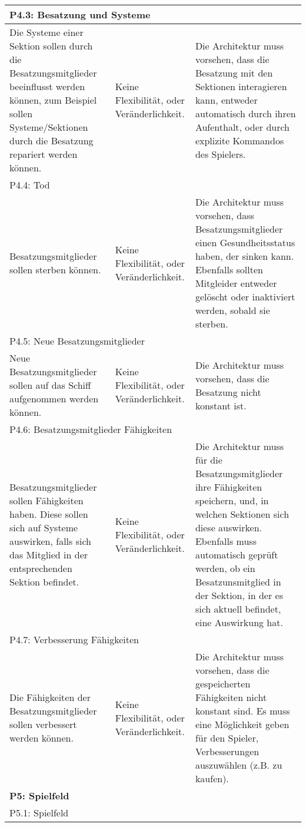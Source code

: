 \documentclass[fontsize=12pt,paper=a4,twoside]{scrartcl}
\begin{document}
\begin{longtable}[c]{|p{5cm}|p{5cm}|p{5cm}|}
\multicolumn{3}{|l|}{{P4.3: Besatzung und Systeme}} 
\\ \hline
Die Systeme einer Sektion sollen durch die Besatzungsmitglieder beeinflusst werden können, zum Beispiel sollen Systeme/Sektionen durch die Besatzung repariert werden können. & Keine Flexibilität, oder Veränderlichkeit.    &  Die Architektur muss vorsehen, dass die Besatzung mit den Sektionen interagieren kann, entweder automatisch durch ihren Aufenthalt, oder durch explizite Kommandos des Spielers. 
\\ \hline
\multicolumn{3}{|l|}{{P4.4: Tod}} 
\\ \hline
Besatzungsmitglieder sollen sterben können. & Keine Flexibilität, oder Veränderlichkeit.    & Die Architektur muss vorsehen, dass Besatzungsmitglieder einen Gesundheitsstatus haben, der sinken kann. Ebenfalls sollten Mitgleider entweder gelöscht oder inaktiviert werden, sobald sie sterben. 
\\ \hline
\multicolumn{3}{|l|}{{P4.5: Neue Besatzungsmitglieder}} 
\\ \hline
Neue Besatzungsmitglieder sollen auf das Schiff aufgenommen werden können. & Keine Flexibilität, oder Veränderlichkeit.    &  Die Architektur muss vorsehen, dass die Besatzung nicht konstant ist. 
\\ \hline
\multicolumn{3}{|l|}{{P4.6: Besatzungsmitglieder Fähigkeiten}} 
\\ \hline
Besatzungsmitglieder sollen Fähigkeiten haben. Diese sollen sich auf Systeme auswirken, falls sich das Mitglied in der entsprechenden Sektion befindet. & Keine Flexibilität, oder Veränderlichkeit.    &  Die Architektur muss für die Besatzungsmitglieder ihre Fähigkeiten speichern, und, in welchen Sektionen sich diese auswirken. Ebenfalls muss automatisch geprüft werden, ob ein Besatzunsmitglied in der Sektion, in der es sich aktuell befindet, eine Auswirkung hat. 
\\ \hline
\multicolumn{3}{|l|}{{P4.7: Verbesserung Fähigkeiten}} 
\\ \hline
Die Fähigkeiten der Besatzungsmitglieder sollen verbessert werden können. & Keine Flexibilität, oder Veränderlichkeit.    & Die Architektur muss vorsehen, dass die gespeicherten Fähigkeiten nicht konstant sind. Es muss eine Möglichkeit geben für den Spieler, Verbesserungen auszuwählen (z.B. zu kaufen). 
\\ \hline
%
\multicolumn{3}{|l|}{{\textbf{P5: Spielfeld}}} 
\\ \hline         
\multicolumn{3}{|l|}{{P5.1: Spielfeld}} 
\\ \hline

\end{longtable}
\end{document}
